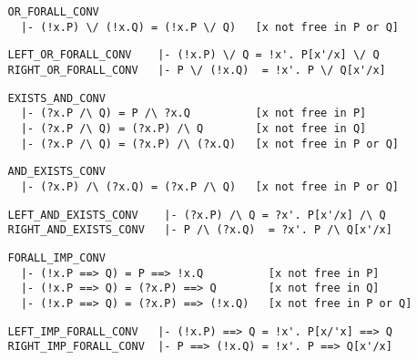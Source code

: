 \begin{hol}\begin{verbatim}
   OR_FORALL_CONV
     |- (!x.P) \/ (!x.Q) = (!x.P \/ Q)   [x not free in P or Q]
\end{verbatim}\end{hol}

\begin{hol}\begin{verbatim}
   LEFT_OR_FORALL_CONV    |- (!x.P) \/ Q = !x'. P[x'/x] \/ Q
   RIGHT_OR_FORALL_CONV   |- P \/ (!x.Q)  = !x'. P \/ Q[x'/x]
\end{verbatim}\end{hol}

\begin{hol}\begin{verbatim}
   EXISTS_AND_CONV
     |- (?x.P /\ Q) = P /\ ?x.Q          [x not free in P]
     |- (?x.P /\ Q) = (?x.P) /\ Q        [x not free in Q]
     |- (?x.P /\ Q) = (?x.P) /\ (?x.Q)   [x not free in P or Q]
\end{verbatim}\end{hol}

\begin{hol}\begin{verbatim}
   AND_EXISTS_CONV
     |- (?x.P) /\ (?x.Q) = (?x.P /\ Q)   [x not free in P or Q]
\end{verbatim}\end{hol}

\begin{hol}\begin{verbatim}
   LEFT_AND_EXISTS_CONV    |- (?x.P) /\ Q = ?x'. P[x'/x] /\ Q
   RIGHT_AND_EXISTS_CONV   |- P /\ (?x.Q)  = ?x'. P /\ Q[x'/x]
\end{verbatim}\end{hol}

\begin{hol}\begin{verbatim}
   FORALL_IMP_CONV
     |- (!x.P ==> Q) = P ==> !x.Q          [x not free in P]
     |- (!x.P ==> Q) = (?x.P) ==> Q        [x not free in Q]
     |- (!x.P ==> Q) = (?x.P) ==> (!x.Q)   [x not free in P or Q]
\end{verbatim}\end{hol}

\begin{hol}\begin{verbatim}
   LEFT_IMP_FORALL_CONV   |- (!x.P) ==> Q = !x'. P[x/'x] ==> Q
   RIGHT_IMP_FORALL_CONV  |- P ==> (!x.Q) = !x'. P ==> Q[x'/x]
\end{verbatim}\end{hol}

